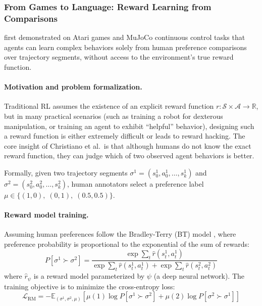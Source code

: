 \subsubsection{From Games to Language: Reward Learning from Comparisons}
\label{sec:t2-christiano}

 first demonstrated on Atari games and MuJoCo continuous control tasks that
agents can learn complex behaviors solely from human preference comparisons over trajectory segments,
without access to the environment's true reward function.

\paragraph{Motivation and problem formalization.}
Traditional RL assumes the existence of an explicit reward function $r: \mathcal{S} \times \mathcal{A} \to \mathbb{R}$,
but in many practical scenarios (such as training a robot for dexterous manipulation, or training an agent to exhibit ``helpful'' behavior),
designing such a reward function is either extremely difficult or leads to reward hacking.
The core insight of Christiano et al.\ is that
although humans do not know the exact reward function,
they can judge which of two observed agent behaviors is better.

Formally, given two trajectory segments $\sigma^1 = (s_0^1, a_0^1, \ldots, s_k^1)$ and
$\sigma^2 = (s_0^2, a_0^2, \ldots, s_k^2)$,
human annotators select a preference label $\mu \in \{(1,0),\; (0,1),\; (0.5, 0.5)\}$.

\paragraph{Reward model training.}
Assuming human preferences follow the Bradley-Terry (BT) model \cite{bradley1952bt},
where preference probability is proportional to the exponential of the sum of rewards:
\begin{equation}
\label{eq:pref:bt-christiano}
P[\sigma^1 \succ \sigma^2] = \frac{\exp\!\sum_t \hat{r}(s_t^1, a_t^1)}{\exp\!\sum_t \hat{r}(s_t^1, a_t^1) + \exp\!\sum_t \hat{r}(s_t^2, a_t^2)}
\end{equation}
where $\hat{r}_\psi$ is a reward model parameterized by $\psi$ (a deep neural network).
The training objective is to minimize the cross-entropy loss:
\begin{equation}
\label{eq:pref:rm-loss-christiano}
\mathcal{L}_{\text{RM}} = -\mathbb{E}_{(\sigma^1, \sigma^2, \mu)}\left[
  \mu(1)\log P[\sigma^1 \succ \sigma^2] + \mu(2)\log P[\sigma^2 \succ \sigma^1]
\right]
\end{equation}

